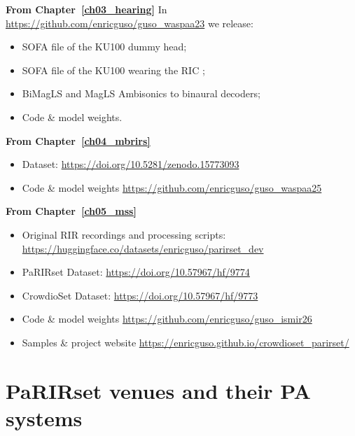 \textbf{From Chapter~\ref{ch03_hearing}}
In \url{https://github.com/enricguso/guso_waspaa23} we release:
\begin{itemize}
    \item \acrshort{SOFA} file of the \acrshort{KU100} dummy head;
    \item  \acrshort{SOFA} file of the \acrshort{KU100} wearing the \acrshort{RIC} ;    
    \item \acrshort{BiMagLS} and \acrshort{MagLS} Ambisonics to binaural decoders;
    \item Code \& model weights.
\end{itemize}

\textbf{From Chapter~\ref{ch04_mbrirs}}
\begin{itemize}
    \item Dataset: \url{https://doi.org/10.5281/zenodo.15773093}
    \item Code \& model weights \url{https://github.com/enricguso/guso_waspaa25} 
\end{itemize}

\textbf{From Chapter~\ref{ch05_mss}}
\begin{itemize}
    \item Original \acrshort{RIR} recordings and processing scripts: \url{https://huggingface.co/datasets/enricguso/parirset_dev}
    \item PaRIRset Dataset: \url{https://doi.org/10.57967/hf/9774}
    \item CrowdioSet Dataset: \url{https://doi.org/10.57967/hf/9773}
    \item Code \& model weights \url{https://github.com/enricguso/guso_ismir26} 
    \item Samples \& project website \url{https://enricguso.github.io/crowdioset_parirset/} 
\end{itemize}



\chapter{PaRIRset venues and their \acrshort{PA} systems}
\label{app:parirset}

\setlength{\LTleft}{0pt}
\setlength{\LTright}{0pt}

